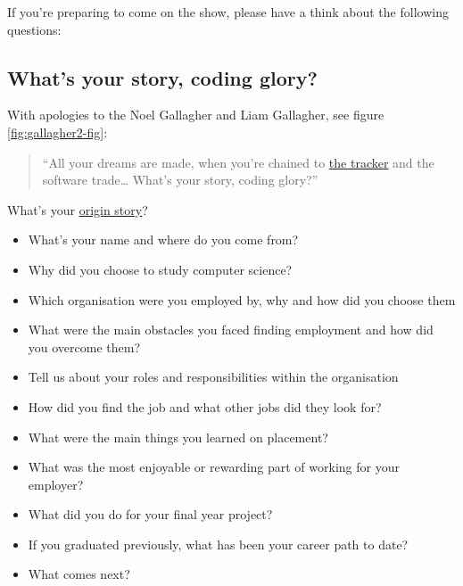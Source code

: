 \documentclass[
]{book}
\providecommand{\tightlist}{%
  \setlength{\itemsep}{0pt}\setlength{\parskip}{0pt}}
\begin{document}
If you're preparing to come on the show, please have a think about the following questions:

\hypertarget{your-story}{%
\subsection{What's your story, coding glory?}\label{your-story}}

With apologies to the Noel Gallagher and Liam Gallagher, see figure \ref{fig:gallagher2-fig}:

\begin{quote}
``All your dreams are made, when you're chained to \href{https://en.wikipedia.org/wiki/Comparison_of_issue-tracking_systems}{the tracker} and the software trade\ldots{}
What's your story, coding glory?''
\end{quote}

What's your \href{https://en.wikipedia.org/wiki/Origin_story}{origin story}?

\begin{itemize}
\tightlist
\item
  What's your name and where do you come from? \citep{blinddate}
\item
  Why did you choose to study computer science?
\item
  Which organisation were you employed by, why and how did you choose them
\item
  What were the main obstacles you faced finding employment and how did you overcome them?
\item
  Tell us about your roles and responsibilities within the organisation
\item
  How did you find the job and what other jobs did they look for?
\item
  What were the main things you learned on placement?
\item
  What was the most enjoyable or rewarding part of working for your employer?
\item
  What did you do for your final year project?
\item
  If you graduated previously, what has been your career path to date?
\item
  What comes next?
\end{itemize}
\end{document}
